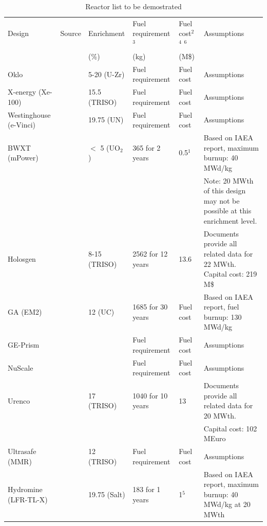\begin{landscape}
\begin{table} [ht]
\begin{center}

\caption{Reactor list to be demostrated}
\label{demonstrate}
\begin{tabular}{|l|l|l|l|l|l|}
\hline 
Design							& Source 	&Enrichment	& Fuel requirement$^3$		&Fuel cost$^2$	$^4$ $^6$		&Assumptions 	 \\ 
										&						& (\%) 								&  (kg)												& (M\$)								& 	 \\ 
\hline 
Oklo								&						&5-20 (U-Zr)								& Fuel requirement 		&Fuel cost 			&Assumptions 	 \\ 
X-energy (Xe-100)					&						&15.5	(TRISO)						 	& Fuel requirement 		&Fuel cost 			&Assumptions 	 \\ 
Westinghouse (e-Vinci)		&						&19.75	 (UN)				 	& Fuel requirement 		&Fuel cost 			&Assumptions 	 \\ 
BWXT (mPower)  & \cite{iaea_advances_2018}		& $<$ 5 (UO$_2$) 	& 365 for 2 years 	& 0.5$^1$			& Based on IAEA report, maximum burnup: 40 MWd/kg	 \\ 
  &		&  	&  	& 			& Note: 20 MWth of this design may not be possible at this enrichment level.	 \\ 
Holosgen	& \cite{filippone_holos_2017} \cite{stauff_neutronic_2019}	&8-15 (TRISO)	& 2562 for 12 years		&13.6	& Documents provide all related data for 22 MWth. Capital cost: 219 M\$	 \\ 
GA	(EM2)							&		 \cite{iaea_advances_2018}		 \cite{schleicher_design_2014}			& 12 (UC)  	& 1685 for 30 years		&Fuel cost 		&Based on IAEA report, fuel burnup: 130 MWd/kg 	 \\ 
GE-Prism				&						&  	& Fuel requirement		&Fuel cost 		&Assumptions 	 \\ 
NuScale					&						&  	& Fuel requirement		&Fuel cost 		&Assumptions 	 \\ 
Urenco					& \cite{ding_design_2011}	&17 (TRISO)  	& 1040	 for 10 years		&13			& Documents provide all related data for 20 MWth.  	 \\ 
					& 	&  	& 	&			& Capital cost: 102 MEuro 	 \\ 
Ultrasafe (MMR)				&\cite{venneri_neutronic_2015}					&12 (TRISO) 	& Fuel requirement		&Fuel cost			&Assumptions 	 \\ 
Hydromine (LFR-TL-X)			& \cite{iaea_advances_2018}					&19.75 (Salt) 	& 183 for 1 years		&1$^5$		&Based on IAEA report, maximum burnup: 40 MWd/kg at 20 MWth 	 \\ 
\hline


\end{tabular}
\end{center}
\end{table}
\end{landscape}
